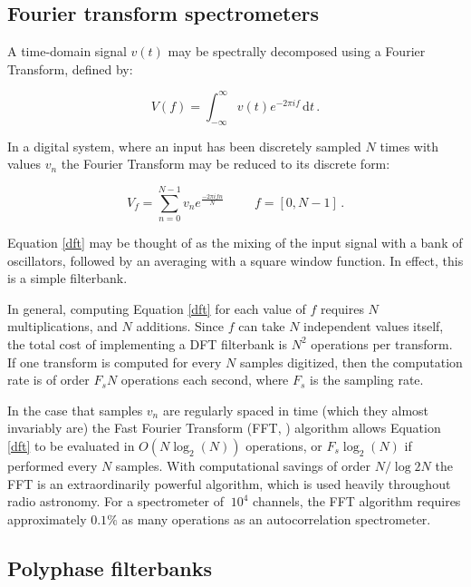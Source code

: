 \documentclass{ws-rv961x669}
\begin{document}
\subsection{Fourier transform spectrometers}

A time-domain signal $v(t)$ may be spectrally decomposed using a Fourier Transform, defined by:

\begin{equation}
 \label{ft}
 V(f) = \int_{-\infty}^{\infty} v(t) e^{-2\pi i f} \,\mathrm{d}t\, .
\end{equation}

In a digital system, where an input has been discretely sampled $N$ times with values $v_n$ the Fourier Transform may be reduced to its discrete form: 

\begin{equation}
 \label{dft}
 V_f = \sum_{n = 0}^{N-1} v_n e^{\frac{-2\pi i f n}{N}} \hspace{1cm} f = [0, N-1]\,.
\end{equation}

Equation \ref{dft} may be thought of as the mixing of the input signal with a bank of oscillators, followed by an averaging with a square window function. In effect, this is a simple filterbank.

In general, computing Equation \ref{dft} for each value of $f$ requires $N$ multiplications, and $N$ additions. Since $f$ can take $N$ independent values itself, the total cost of implementing a DFT filterbank is $N^2$ operations per transform. If one transform is computed for every $N$ samples digitized, then the computation rate is of order $F_sN$ operations each second, where $F_s$ is the sampling rate.

In the case that samples $v_n$ are regularly spaced in time (which they almost invariably are) the Fast Fourier Transform (FFT, \cite{Cooley1965}) algorithm allows Equation \ref{dft} to be evaluated in $O(N\log_2(N))$ operations, or $F_s\log_2(N)$ if performed every $N$ samples. With computational savings of order $N / \log2{N}$ the FFT is an extraordinarily powerful algorithm, which is used heavily throughout radio astronomy. For a spectrometer of $~10^4$ channels, the FFT algorithm requires approximately $0.1\%$ as many operations as an autocorrelation spectrometer.







\subsection{Polyphase filterbanks}
\end{document}

